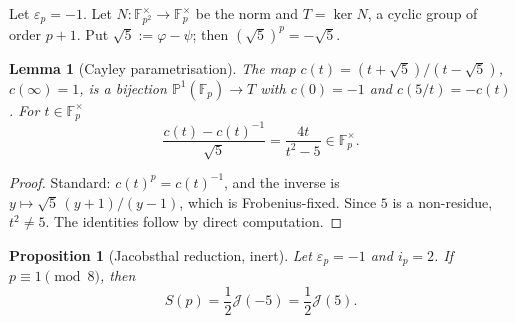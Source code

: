 \documentclass[11pt]{amsart}
\theoremstyle{plain}
\newtheorem{proposition}[theorem]{Proposition}
\newtheorem{lemma}[theorem]{Lemma}
\theoremstyle{definition}
\newcommand{\Fp}{\mathbb{F}_p}
\newcommand{\Fpp}{\mathbb{F}_{p^2}}
\newcommand{\Jac}{\mathcal{J}}
\begin{document}
Let $\varepsilon_p=-1$. Let $N:\Fpp^{\times}\to\Fp^{\times}$ be the norm and
$T=\ker N$, a cyclic group of order $p+1$. Put $\sqrt5:=\varphi-\psi$; then
$(\sqrt5)^p=-\sqrt5$.

\begin{lemma}[Cayley parametrisation]\label{lem:cayley}
The map $c(t)=(t+\sqrt5)/(t-\sqrt5)$, $c(\infty)=1$, is a bijection
$\mathbb P^1(\Fp)\to T$ with $c(0)=-1$ and $c(5/t)=-c(t)$. For $t\in\Fp^{\times}$
\[
  \frac{c(t)-c(t)^{-1}}{\sqrt5}=\frac{4t}{t^2-5}\in\Fp^{\times}.
\]
\end{lemma}
\begin{proof}
Standard: $c(t)^p=c(t)^{-1}$, and the inverse is $y\mapsto\sqrt5\,(y+1)/(y-1)$,
which is Frobenius-fixed. Since $5$ is a non-residue, $t^2\ne5$. The identities
follow by direct computation.
\end{proof}

\begin{proposition}[Jacobsthal reduction, inert]\label{prop:inert-red}
Let $\varepsilon_p=-1$ and $i_p=2$. If $p\equiv1\pmod 8$, then
\[
  S(p)=\frac12\Jac(-5)=\frac12\Jac(5).
\]
\end{proposition}
\end{document}

